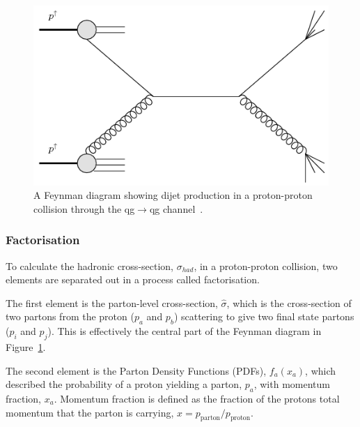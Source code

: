 \begin{figure}[!hbt]
  \begin{center}
    \includegraphics[width=0.7\linewidth, angle=0]{figs/Theory/qcd_dijet_feynman.png}
  \end{center}
  \caption[A Feynman diagram showing dijet production in a proton-proton collision through the qg$\to$qg channel.]
          {A Feynman diagram showing dijet production in a proton-proton collision through the qg$\to$qg channel~\cite{theo-qcd_dijet_feynman}.}
  \label{fig:theo-qcd_dijet_feynman}
\end{figure}

\subsubsection{Factorisation}

To calculate the hadronic cross-section, $\sigma_{had}$, in a proton-proton collision,
two elements are separated out in a process called factorisation.

The first element is the parton-level cross-section, $\hat{\sigma}$, which is the cross-section of
two partons from the proton ($p_a$ and $p_b$) scattering to give two final state partons ($p_i$ and $p_j$).
This is effectively the central part of the Feynman diagram in Figure~\ref{fig:theo-qcd_dijet_feynman}.

The second element is the Parton Density Functions (PDFs), $f_a(x_a)$, which described the probability of
a proton yielding a parton, $p_a$, with momentum fraction, $x_a$.
Momentum fraction is defined as the fraction of the protons total momentum that the parton is carrying, $x = p_{\text{parton}}/p_{\text{proton}}$.

